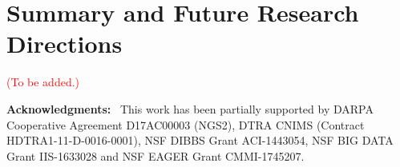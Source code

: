 \section{Summary and Future Research Directions}
\label{sec:concl}

\textcolor{red}{(To be added.)} 

\smallskip

\noindent
\textbf{Acknowledgments:}~
This work has been partially supported by
DARPA Cooperative Agreement D17AC00003 (NGS2),
DTRA CNIMS (Contract HDTRA1-11-D-0016-0001),
NSF DIBBS Grant ACI-1443054,
NSF BIG DATA Grant IIS-1633028 and
NSF EAGER Grant CMMI-1745207.


